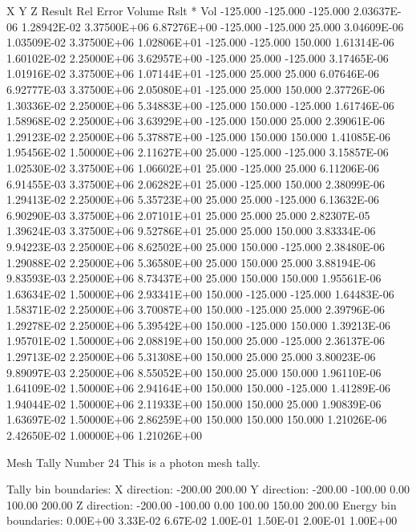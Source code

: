         X         Y         Z     Result     Rel Error     Volume    Rslt * Vol
   -125.000  -125.000  -125.000 2.03637E-06 1.28942E-02 3.37500E+06 6.87276E+00
   -125.000  -125.000    25.000 3.04609E-06 1.03509E-02 3.37500E+06 1.02806E+01
   -125.000  -125.000   150.000 1.61314E-06 1.60102E-02 2.25000E+06 3.62957E+00
   -125.000    25.000  -125.000 3.17465E-06 1.01916E-02 3.37500E+06 1.07144E+01
   -125.000    25.000    25.000 6.07646E-06 6.92777E-03 3.37500E+06 2.05080E+01
   -125.000    25.000   150.000 2.37726E-06 1.30336E-02 2.25000E+06 5.34883E+00
   -125.000   150.000  -125.000 1.61746E-06 1.58968E-02 2.25000E+06 3.63929E+00
   -125.000   150.000    25.000 2.39061E-06 1.29123E-02 2.25000E+06 5.37887E+00
   -125.000   150.000   150.000 1.41085E-06 1.95456E-02 1.50000E+06 2.11627E+00
     25.000  -125.000  -125.000 3.15857E-06 1.02530E-02 3.37500E+06 1.06602E+01
     25.000  -125.000    25.000 6.11206E-06 6.91455E-03 3.37500E+06 2.06282E+01
     25.000  -125.000   150.000 2.38099E-06 1.29413E-02 2.25000E+06 5.35723E+00
     25.000    25.000  -125.000 6.13632E-06 6.90290E-03 3.37500E+06 2.07101E+01
     25.000    25.000    25.000 2.82307E-05 1.39624E-03 3.37500E+06 9.52786E+01
     25.000    25.000   150.000 3.83334E-06 9.94223E-03 2.25000E+06 8.62502E+00
     25.000   150.000  -125.000 2.38480E-06 1.29088E-02 2.25000E+06 5.36580E+00
     25.000   150.000    25.000 3.88194E-06 9.83593E-03 2.25000E+06 8.73437E+00
     25.000   150.000   150.000 1.95561E-06 1.63634E-02 1.50000E+06 2.93341E+00
    150.000  -125.000  -125.000 1.64483E-06 1.58371E-02 2.25000E+06 3.70087E+00
    150.000  -125.000    25.000 2.39796E-06 1.29278E-02 2.25000E+06 5.39542E+00
    150.000  -125.000   150.000 1.39213E-06 1.95701E-02 1.50000E+06 2.08819E+00
    150.000    25.000  -125.000 2.36137E-06 1.29713E-02 2.25000E+06 5.31308E+00
    150.000    25.000    25.000 3.80023E-06 9.89097E-03 2.25000E+06 8.55052E+00
    150.000    25.000   150.000 1.96110E-06 1.64109E-02 1.50000E+06 2.94164E+00
    150.000   150.000  -125.000 1.41289E-06 1.94044E-02 1.50000E+06 2.11933E+00
    150.000   150.000    25.000 1.90839E-06 1.63697E-02 1.50000E+06 2.86259E+00
    150.000   150.000   150.000 1.21026E-06 2.42650E-02 1.00000E+06 1.21026E+00

 Mesh Tally Number        24
 This is a photon mesh tally.

 Tally bin boundaries:
    X direction:   -200.00    200.00
    Y direction:   -200.00   -100.00      0.00    100.00    200.00
    Z direction:   -200.00   -100.00      0.00    100.00    150.00    200.00
    Energy bin boundaries: 0.00E+00 3.33E-02 6.67E-02 1.00E-01 1.50E-01 2.00E-01 1.00E+00

